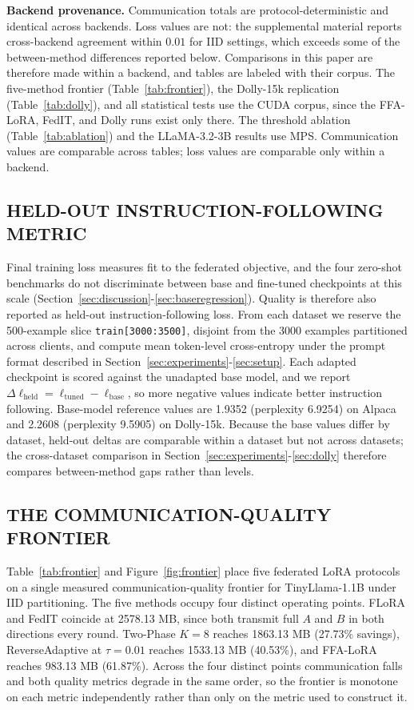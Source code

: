 \textbf{Backend provenance.} Communication totals are protocol-deterministic and identical across backends. Loss values are not: the supplemental material reports cross-backend agreement within $0.01$ for IID settings, which exceeds some of the between-method differences reported below. Comparisons in this paper are therefore made within a backend, and tables are labeled with their corpus. The five-method frontier (Table~\ref{tab:frontier}), the Dolly-15k replication (Table~\ref{tab:dolly}), and all statistical tests use the CUDA corpus, since the FFA-LoRA, FedIT, and Dolly runs exist only there. The threshold ablation (Table~\ref{tab:ablation}) and the LLaMA-3.2-3B results use MPS. Communication values are comparable across tables; loss values are comparable only within a backend.

\subsection{HELD-OUT INSTRUCTION-FOLLOWING METRIC}
\label{sec:heldout}
Final training loss measures fit to the federated objective, and the four zero-shot benchmarks do not discriminate between base and fine-tuned checkpoints at this scale (Section~\ref{sec:discussion}-\ref{sec:baseregression}). Quality is therefore also reported as held-out instruction-following loss. From each dataset we reserve the 500-example slice \texttt{train[3000:3500]}, disjoint from the 3000 examples partitioned across clients, and compute mean token-level cross-entropy under the prompt format described in Section~\ref{sec:experiments}-\ref{sec:setup}. Each adapted checkpoint is scored against the unadapted base model, and we report $\Delta\ell_{\mathrm{held}} = \ell_{\mathrm{tuned}} - \ell_{\mathrm{base}}$, so more negative values indicate better instruction following. Base-model reference values are 1.9352 (perplexity 6.9254) on Alpaca and 2.2608 (perplexity 9.5905) on Dolly-15k. Because the base values differ by dataset, held-out deltas are comparable within a dataset but not across datasets; the cross-dataset comparison in Section~\ref{sec:experiments}-\ref{sec:dolly} therefore compares between-method gaps rather than levels.

\subsection{THE COMMUNICATION-QUALITY FRONTIER}
\label{sec:frontier}
Table~\ref{tab:frontier} and Figure~\ref{fig:frontier} place five federated LoRA protocols on a single measured communication-quality frontier for TinyLlama-1.1B \cite{zhang2024tinyllama} under IID partitioning. The five methods occupy four distinct operating points. FLoRA \cite{wang2024flora} and FedIT \cite{zhang2024federatedgpt} coincide at 2578.13 MB, since both transmit full $A$ and $B$ in both directions every round. Two-Phase $K{=}8$ reaches 1863.13 MB (27.73\% savings), ReverseAdaptive at $\tau{=}0.01$ reaches 1533.13 MB (40.53\%), and FFA-LoRA \cite{sun2024ffalora} reaches 983.13 MB (61.87\%). Across the four distinct points communication falls and both quality metrics degrade in the same order, so the frontier is monotone on each metric independently rather than only on the metric used to construct it.

